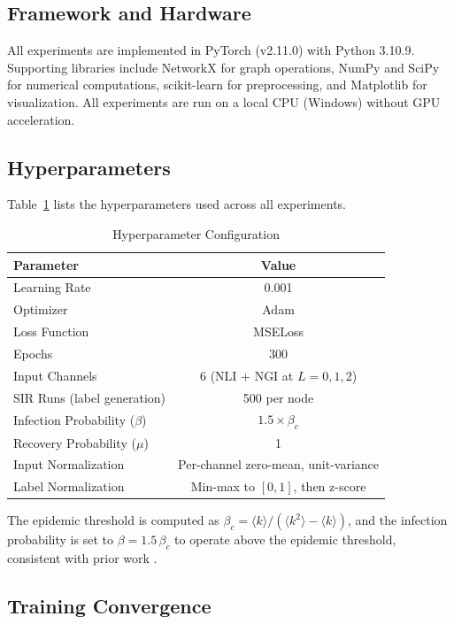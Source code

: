 \subsection{Framework and Hardware}

All experiments are implemented in PyTorch (v2.11.0) with Python 3.10.9.
Supporting libraries include NetworkX for graph operations, NumPy and
SciPy for numerical computations, scikit-learn for preprocessing, and
Matplotlib for visualization. All experiments are run on a local CPU
(Windows) without GPU acceleration.


\subsection{Hyperparameters}

Table~\ref{tab:hyper} lists the hyperparameters used across all
experiments.

\begin{table}[h]
\centering
\caption{Hyperparameter Configuration}
\label{tab:hyper}
\begin{tabular}{|l|c|}
\hline
\textbf{Parameter} & \textbf{Value} \\
\hline
Learning Rate & 0.001 \\
Optimizer & Adam \\
Loss Function & MSELoss \\
Epochs & 300 \\
Input Channels & 6 (NLI + NGI at $L = 0, 1, 2$) \\
SIR Runs (label generation) & 500 per node \\
Infection Probability ($\beta$) & $1.5 \times \beta_c$ \\
Recovery Probability ($\mu$) & 1 \\
Input Normalization & Per-channel zero-mean, unit-variance \\
Label Normalization & Min-max to $[0,1]$, then z-score \\
\hline
\end{tabular}
\end{table}

The epidemic threshold is computed as $\beta_c = \langle k \rangle /
(\langle k^2 \rangle - \langle k \rangle)$,
and the infection probability is set to $\beta = 1.5\,\beta_c$ to
operate above the epidemic threshold, consistent with prior work
\cite{guo2026, chen2012}.

\subsection{Training Convergence}

